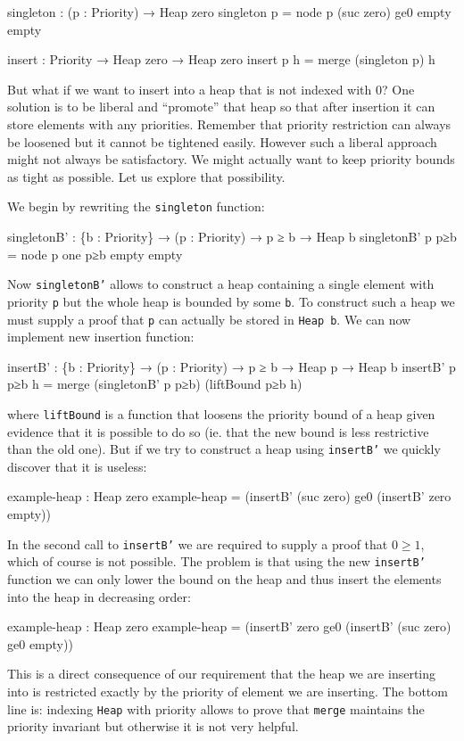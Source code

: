 \begin{code}
singleton : (p : Priority) → Heap zero
singleton p = node p (suc zero) ge0 empty empty

insert : Priority → Heap zero → Heap zero
insert p h = merge (singleton p) h
\end{code}

But what if we want to insert into a heap that is not indexed with 0? One solution is to be liberal and ``promote'' that heap so that after insertion it can store elements with any priorities. Remember that priority restriction can always be loosened but it cannot be tightened easily. However such a liberal approach might not always be satisfactory. We might actually want to keep priority bounds as tight as possible. Let us explore that possibility.

We begin by rewriting the \texttt{singleton} function:

\begin{code}
singletonB' : \{b : Priority\} → (p : Priority) → p ≥ b → Heap b
singletonB' p p≥b = node p one p≥b empty empty
\end{code}
\noindent
Now \texttt{singletonB'} allows to construct a heap containing a single element with priority \texttt{p} but the whole heap is bounded by some \texttt{b}. To construct such a heap we must supply a proof that \texttt{p} can actually be stored in \texttt{Heap b}. We can now implement new insertion function:

\begin{small}
\begin{code}
insertB' : \{b : Priority\} → (p : Priority) → p ≥ b → Heap p → Heap b
insertB' p p≥b h = merge (singletonB' p p≥b) (liftBound p≥b h)
\end{code}
\end{small}
\noindent
where \texttt{liftBound} is a function that loosens the priority bound of a heap given evidence that it is possible to do so (ie. that the new bound is less restrictive than the old one). But if we try to construct a heap using \texttt{insertB'} we quickly discover that it is useless:

\begin{code}
example-heap : Heap zero
example-heap = (insertB' (suc zero) ge0
               (insertB' zero  empty))
\end{code}
\noindent
In the second call to \texttt{insertB'} we are required to supply a proof that $0 \ge 1$, which of course is not possible. The problem is that using the new \texttt{insertB'} function we can only lower the bound on the heap and thus insert the elements into the heap in decreasing order:

\begin{code}
example-heap : Heap zero
example-heap = (insertB' zero ge0
               (insertB' (suc zero) ge0 empty))
\end{code}
\noindent
This is a direct consequence of our requirement that the heap we are inserting into is restricted exactly by the priority of element we are inserting. The bottom line is: indexing \texttt{Heap} with priority allows to prove that \texttt{merge} maintains the priority invariant but otherwise it is not very helpful.